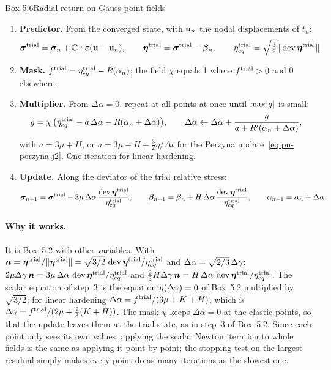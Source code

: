 \begin{gbox}{Box 5.6\quad Radial return on Gauss-point fields}\label{box:pn-fields}
%
\begin{enumerate}[label=\textbf{\arabic*.},leftmargin=1.6em]
  \item \textbf{Predictor.} From the converged state, with $\mathbf{u}_n$ the
  nodal displacements of $t_n$:
  \[
    \bm{\sigma}^{\mathrm{trial}}=\bm{\sigma}_n+\mathbb{C}:\bm{\varepsilon}(\mathbf{u}-\mathbf{u}_n),\qquad
    \bm{\eta}^{\mathrm{trial}}=\bm{\sigma}^{\mathrm{trial}}-\bm{\beta}_n,\qquad
    \eta_{eq}^{\mathrm{trial}}=\sqrt{\tfrac32}\,\lVert \operatorname{dev}\bm{\eta}^{\mathrm{trial}}\rVert.
  \]
  \item \textbf{Mask.} $f^{\mathrm{trial}}=\eta_{eq}^{\mathrm{trial}}-R(\alpha_n)$; the field
  $\chi$ equals 1 where $f^{\mathrm{trial}}>0$ and 0 elsewhere.
  \item \textbf{Multiplier.} From $\Delta\alpha=0$, repeat at all points at
  once until $\max\lvert g\rvert$ is small:
  \[
    g=\chi\,\bigl(\eta_{eq}^{\mathrm{trial}}-a\,\Delta\alpha-R(\alpha_n+\Delta\alpha)\bigr),\qquad
    \Delta\alpha\leftarrow\Delta\alpha+\frac{g}{a+R'(\alpha_n+\Delta\alpha)},
  \]
  with $a=3\mu+H$, or $a=3\mu+H+\tfrac32\eta/\Delta t$ for the Perzyna
  update~\eqref{eq:pn-perzyna-j2}. One iteration for linear hardening.
  \item \textbf{Update.} Along the deviator of the trial relative stress:
  \[
    \bm{\sigma}_{n+1}=\bm{\sigma}^{\mathrm{trial}}-3\mu\,\Delta\alpha\,\frac{\operatorname{dev}\bm{\eta}^{\mathrm{trial}}}{\eta_{eq}^{\mathrm{trial}}},\qquad
    \bm{\beta}_{n+1}=\bm{\beta}_n+H\,\Delta\alpha\,\frac{\operatorname{dev}\bm{\eta}^{\mathrm{trial}}}{\eta_{eq}^{\mathrm{trial}}},\qquad
    \alpha_{n+1}=\alpha_n+\Delta\alpha .
  \]
\end{enumerate}
\end{gbox}

\paragraph{Why it works.}
It is Box~5.2 with other variables. With $\bm{n}=\bm{\eta}^{\mathrm{trial}}/\lVert \bm{\eta}^{\mathrm{trial}}\rVert
=\sqrt{3/2}\,\operatorname{dev}\bm{\eta}^{\mathrm{trial}}/\eta_{eq}^{\mathrm{trial}}$ and $\Delta\alpha=\sqrt{2/3}\,\Delta\gamma$:
$2\mu\Delta\gamma\,\bm{n}=3\mu\,\Delta\alpha\,\operatorname{dev}\bm{\eta}^{\mathrm{trial}}/\eta_{eq}^{\mathrm{trial}}$ and
$\tfrac23H\Delta\gamma\,\bm{n}=H\,\Delta\alpha\,\operatorname{dev}\bm{\eta}^{\mathrm{trial}}/\eta_{eq}^{\mathrm{trial}}$. The scalar
equation of step~3 is the equation $g(\Delta\gamma)=0$ of Box~5.2 multiplied by
$\sqrt{3/2}$; for linear hardening $\Delta\alpha=f^{\mathrm{trial}}/(3\mu+K+H)$, which is
$\Delta\gamma=f^{\mathrm{trial}}/(2\mu+\tfrac23(K+H))$. The mask $\chi$ keeps $\Delta\alpha=0$ at the
elastic points, so that the update leaves them at the trial state, as in
step~3 of Box~5.2. Since each point only sees its own values, applying the
scalar Newton iteration to whole fields is the same as applying it point by
point; the stopping test on the largest residual simply makes every point do
as many iterations as the slowest one.


